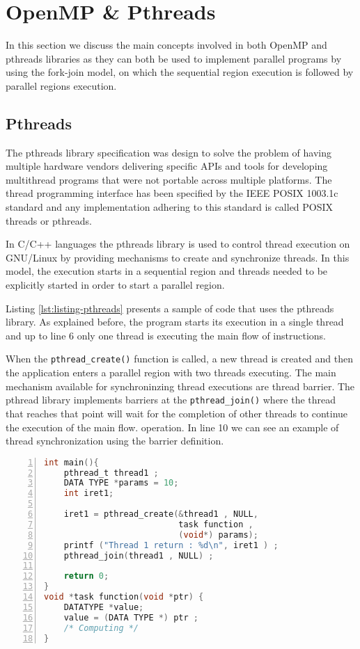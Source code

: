 \section{OpenMP \& Pthreads}
\label{sec:apis}

In this section we discuss the main concepts involved in both OpenMP and
pthreads libraries as they can both be used to implement parallel programs by
using the fork-join model, on which the sequential region execution is followed
by parallel regions execution.


\subsection{Pthreads}

The pthreads library specification was design to solve the problem of having
multiple hardware vendors delivering specific APIs and tools for developing
multithread programs that were not portable across multiple platforms. The
thread programming interface has been specified by the IEEE POSIX 1003.1c
standard and any implementation adhering to this standard is called POSIX
threads or pthreads.

In C/C++ languages the pthreads library is used to control thread execution
on GNU/Linux by providing mechanisms to create and synchronize threads. In this
model, the execution starts in a sequential region and threads needed to be
explicitly started in order to start a parallel region.

Listing \ref{lst:listing-pthreads} presents a sample of code that uses the
pthreads library. As explained before, the program starts its execution in a
single thread and up to line 6 only one thread is executing the main flow of
instructions.

When the \texttt{pthread\_create()} function is called, a new thread is created
and then the application enters a parallel region with two threads executing.
The main mechanism available for synchroninzing thread executions are thread
barrier. The pthread library implements barriers at the
\texttt{pthread\_join()} where the thread that reaches that point will wait for
the completion of other threads to continue the execution of the main flow.
operation. In line 10 we can see an example of thread synchronization using the
barrier definition.

\begin{lstlisting}[language=C, basicstyle=\footnotesize, numbers=left, 
                   frame=single, showspaces=false, showstringspaces=false,
                   caption={Pthread Sample Program}, captionpos=b,
                   label=lst:listing-pthreads]
int main(){
    pthread_t thread1 ;
    DATA TYPE *params = 10;
    int iret1;
    
    iret1 = pthread_create(&thread1 , NULL, 
                           task function , 
                           (void*) params);
    printf ("Thread 1 return : %d\n", iret1 ) ;
    pthread_join(thread1 , NULL) ;

    return 0;
}
void *task function(void *ptr) { 
    DATATYPE *value;
    value = (DATA TYPE *) ptr ;
    /* Computing */
}
\end{lstlisting}

